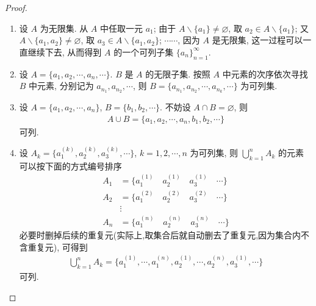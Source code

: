 \documentclass[../../main.tex]{subfiles}%
\begin{document}
\begin{proof}
\begin{enumerate}[(1)]
\item 设 $A$ 为无限集. 从 $A$ 中任取一元 $a_1$; 由于 $A \backslash  \{a_1\} \neq \varnothing$, 取 $a_2 \in A\backslash \{a_1\}$; 又 $A \backslash  \{a_1, a_2\} \neq \varnothing$, 取 $a_3 \in A \backslash  \{a_1, a_2\}$; $\cdots\cdots$, 因为 $A$ 是无限集, 这一过程可以一直继续下去, 从而得到 $A$ 的一个可列子集 $\{a_n\}_{n = 1}^{\infty}$.

\item 设 $A = \{a_1, a_2, \cdots, a_n, \cdots\}$. $B$ 是 $A$ 的无限子集. 按照 $A$ 中元素的次序依次寻找 $B$ 中元素, 分别记为 $a_{n_1}, a_{n_2}, \cdots$, 则 $B = \{a_{n_1}, a_{n_2}, \cdots, a_{n_k}, \cdots\}$ 为可列集.

\item 设 $A = \{a_1, a_2, \cdots, a_n\}$, $B = \{b_1, b_2, \cdots\}$. 不妨设 $A \cap B = \varnothing$, 则
\begin{align*}
A \cup B = \{a_1, a_2, \cdots, a_n, b_1, b_2, \cdots\}
\end{align*}
可列.

\item 设 $A_k = \{a_1^{(k)}, a_2^{(k)}, a_3^{(k)}, \cdots\}$, $k = 1, 2, \cdots, n$ 为可列集, 则 $\bigcup_{k = 1}^{n} A_k$ 的元素可以按下面的方式编号排序
\begin{align*}
A_1 &= \{a_1^{(1)} \quad a_2^{(1)} \quad a_3^{(1)} \quad \cdots\}\\
A_2 &= \{a_1^{(2)} \quad a_2^{(2)} \quad a_3^{(2)} \quad \cdots\}\\
&\vdots\\
A_n &= \{a_1^{(n)} \quad a_2^{(n)} \quad a_3^{(n)} \quad \cdots\}
\end{align*}
必要时删掉后续的重复元(实际上,取集合后就自动删去了重复元,因为集合内不含重复元), 可得到
\begin{align*}
\bigcup_{k = 1}^{n} A_k = \{a_1^{(1)}, \cdots, a_1^{(n)}, a_2^{(1)}, \cdots, a_2^{(n)}, a_3^{(1)}, \cdots\}
\end{align*}
可列.


\end{enumerate}
\end{proof}
\end{document}
